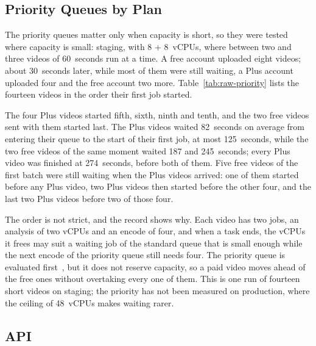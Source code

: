 \subsection{Priority Queues by Plan}
\label{sec:priority-evaluation}

The priority queues matter only when capacity is short, so they were tested where capacity is small:
staging, with 8 + 8~vCPUs, where between two and three videos of 60~seconds run at a time. A free account
uploaded eight videos; about 30~seconds later, while most of them were still waiting, a Plus account
uploaded four and the free account two more. Table~\ref{tab:raw-priority} lists the fourteen videos in
the order their first job started.

The four Plus videos started fifth, sixth, ninth and tenth, and the two free videos sent with them
started last. The Plus videos waited 82~seconds on average from entering their queue to the start of
their first job, at most 125~seconds, while the two free videos of the same moment waited 187 and
245~seconds; every Plus video was finished at 274~seconds, before both of them. Five free videos of
the first batch were still waiting when the Plus videos arrived: one of them started before any Plus
video, two Plus videos then started before the other four, and the last two Plus videos before two
of those four.

The order is not strict, and the record shows why. Each video has two jobs, an analysis of two vCPUs
and an encode of four, and when a task ends, the vCPUs it frees may suit a waiting job of the standard
queue that is small enough while the next encode of the priority queue still needs four. The
priority queue is evaluated first~\cite{awsbatchqueues}, but it does not reserve capacity, so a paid
video moves ahead of the free ones without overtaking every one of them. This is one run of fourteen
short videos on staging; the priority has not been measured on production, where the ceiling of
48~vCPUs makes waiting rarer.

\subsection{API}
\label{sec:backend-evaluation}

